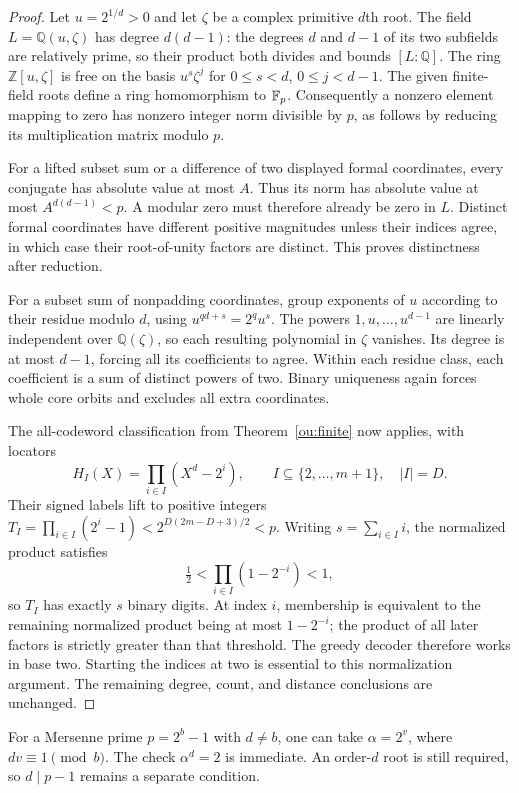 \begin{proof}
Let $u=2^{1/d}>0$ and let $\zeta$ be a complex primitive $d$th root.
The field $L=\mathbb Q(u,\zeta)$ has degree $d(d-1)$: the degrees
$d$ and $d-1$ of its two subfields are relatively prime, so their
product both divides and bounds $[L:\mathbb Q]$.
The ring $\mathbb Z[u,\zeta]$ is free on the basis
$u^s\zeta^j$ for $0\le s<d$, $0\le j<d-1$.
The given finite-field roots define a ring homomorphism to $\mathbb F_p$.
Consequently a nonzero element mapping to zero has nonzero integer
norm divisible by $p$, as follows by reducing its multiplication
matrix modulo $p$.

For a lifted subset sum or a difference of two displayed formal
coordinates, every conjugate has absolute value at most $A$.
Thus its norm has absolute value at most $A^{d(d-1)}<p$.
A modular zero must therefore already be zero in $L$. Distinct formal
coordinates have different positive magnitudes unless their indices
agree, in which case their root-of-unity factors are distinct. This
proves distinctness after reduction.

For a subset sum of nonpadding coordinates, group exponents of $u$
according to their residue modulo $d$, using $u^{qd+s}=2^qu^s$.
The powers $1,u,\ldots,u^{d-1}$ are linearly independent over
$\mathbb Q(\zeta)$, so each resulting polynomial in $\zeta$ vanishes.
Its degree is at most $d-1$, forcing all its coefficients to agree.
Within each residue class, each coefficient is a sum of distinct
powers of two. Binary uniqueness again forces whole core orbits and
excludes all extra coordinates.

The all-codeword classification from Theorem~\ref{ou:finite} now
applies, with locators
\[
 H_I(X)=\prod_{i\in I}(X^d-2^i),\qquad
 I\subseteq\{2,\ldots,m+1\},\quad |I|=D.
\]
Their signed labels lift to positive integers
$T_I=\prod_{i\in I}(2^i-1)<2^{D(2m-D+3)/2}<p$.
Writing $s=\sum_{i\in I}i$, the normalized product satisfies
\[
 \tfrac12<\prod_{i\in I}(1-2^{-i})<1,
\]
so $T_I$ has exactly $s$ binary digits. At index $i$, membership is
equivalent to the remaining normalized product being at most
$1-2^{-i}$; the product of all later factors is strictly greater than
that threshold. The greedy decoder therefore works in base two.
Starting the indices at two is essential to this normalization argument.
The remaining degree, count, and distance conclusions are unchanged.
\end{proof}

For a Mersenne prime $p=2^b-1$ with $d\ne b$, one can take
$\alpha=2^v$, where $dv\equiv1\pmod b$. The check
$\alpha^d=2$ is immediate. An order-$d$ root is still required, so
$d\mid p-1$ remains a separate condition.

